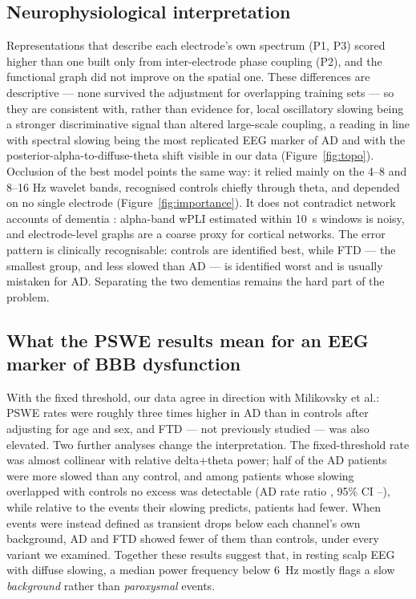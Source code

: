 \subsection{Neurophysiological interpretation}
Representations that describe each electrode's own spectrum (P1, P3) scored higher than one built only
from inter-electrode phase coupling (P2), and the functional graph did not improve on the spatial one.
These differences are descriptive --- none survived the adjustment for overlapping training sets --- so
they are consistent with, rather than evidence for, local oscillatory slowing being a stronger
discriminative signal than altered large-scale coupling, a reading in line with spectral slowing being the most
replicated EEG marker of AD \cite{R3,R15} and with the posterior-alpha-to-diffuse-theta shift visible
in our data (Figure~\ref{fig:topo}). Occlusion of the best model points the same way: it relied
mainly on the 4--8 and 8--16 Hz wavelet bands, recognised controls chiefly through theta, and
depended on no single electrode (Figure~\ref{fig:importance}). It does not contradict network accounts of dementia
\cite{F12,F9}: alpha-band wPLI estimated within \SI{10}{\second} windows is noisy, and electrode-level
graphs are a coarse proxy for cortical networks. The error pattern is clinically recognisable:
controls are identified best, while FTD --- the smallest group, and less slowed than AD --- is
identified worst and is usually mistaken for AD. Separating the two dementias remains the hard part of the problem.

\subsection{What the PSWE results mean for an EEG marker of BBB dysfunction}
With the fixed threshold, our data agree in direction with Milikovsky et al.: PSWE rates were roughly
three times higher in AD than in controls after adjusting for age and sex, and FTD --- not previously
studied --- was also elevated. Two further analyses change the interpretation. The fixed-threshold
rate was almost collinear with relative delta+theta power; half of the AD patients were more slowed
than any control, and among patients whose slowing overlapped with controls no excess was detectable
(AD rate ratio \csADRR{}, 95\% CI \csADLo{}--\csADHi{}),
while relative to the events their slowing predicts, patients had fewer. When events were instead defined as transient drops below each channel's own
background, AD and FTD showed fewer of them than controls, under every variant we examined. Together
these results suggest that, in resting scalp EEG with diffuse slowing, a median power frequency below
\SI{6}{\hertz} mostly flags a slow \emph{background} rather than \emph{paroxysmal} events.

